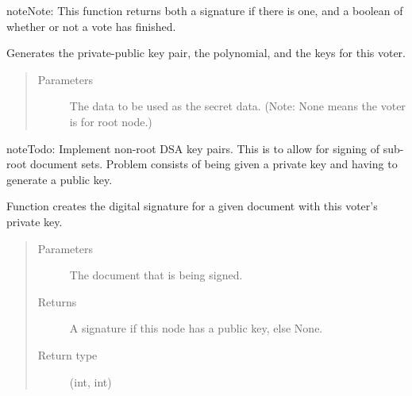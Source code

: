 \documentclass[letterpaper,10pt,english]{sphinxmanual}
\begin{document}
\begin{fulllineitems}
\begin{fulllineitems}
\begin{sphinxadmonition}{note}{Note:}
This function returns both a signature if there is one, and a boolean of whether
or not a vote has finished.
\end{sphinxadmonition}

\end{fulllineitems}


\begin{fulllineitems}
\label{\detokenize{index:Voter.Voter.generate_scheme}}
Generates the private-public key pair, the polynomial, and the keys for this voter.
\begin{quote}\begin{description}
\item[{Parameters}] \leavevmode
{} \textendash{} The data to be used as the secret data.
(Note: None means the voter is for root node.)

\end{description}\end{quote}

\begin{sphinxadmonition}{note}{Todo:}
Implement non-root DSA key pairs. This is to allow for signing of sub-root
document sets. Problem consists of being given a private key and having to
generate a public key.
\end{sphinxadmonition}

\end{fulllineitems}


\begin{fulllineitems}
\label{\detokenize{index:Voter.Voter.sign}}
Function creates the digital signature for a given document with this voter’s private key.
\begin{quote}\begin{description}
\item[{Parameters}] \leavevmode
{} \textendash{} The document that is being signed.

\item[{Returns}] \leavevmode
A signature if this node has a public key, else None.

\item[{Return type}] \leavevmode
(int, int)


\end{description}
\end{quote}
\end{fulllineitems}
\end{fulllineitems}
\end{document}
